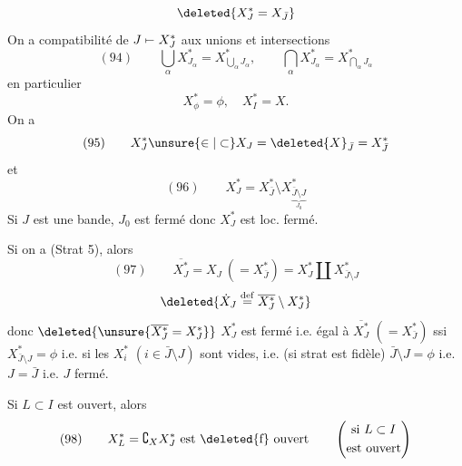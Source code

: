
\[
\deleted{X_J^*=X_{\bar J}}
\]
On a compatibilité de $J\mathrel{\mapstochar\relbar}X_J^*$ aux unions et intersections
\[
(94)\qquad\bigcup_\alpha X_{J_\alpha}^*=X_{\bigcup_\alpha J_\alpha}^*,\qquad\bigcap_\alpha X_{J_\alpha}^*=X_{\bigcap_\alpha J_\alpha}^*
\]
en particulier
\[
X_\phi^*=\phi,\quad X_I^*=X.
\]
On a
\[
(95)\qquad X_J^*\unsure{\in|\subset}X_J=\deleted{X}_{\bar J}=X_{\bar J}^*
\]
et
\[
(96)\qquad X_J^*=X_{\bar J}^*\setminus X_{\underbrace{\bar J\setminus J}_{J_0}}^*
\]
Si $J$ est une bande, $J_0$ est fermé donc $X_J^*$ est loc. fermé.

Si on a (Strat 5), alors
\[
(97)\qquad\overline{X_J^*}=X_J\ (=X_{\bar J}^*)=X_J^*\amalg X_{\bar J\setminus J}^*
\]
\[
\deleted{\dot X_J\overset{\mathrm{def}}=\overline{X_J^*}\setminus X_J^*}
\]
donc $\deleted{\unsure{\overline{X_J^*}=X_J^*}}$ $X_J^*$ est fermé i.e. égal à $\overline{X_J^*}$ $(=X_{\bar J}^*)$ ssi $X_{\bar J\setminus J}^*=\phi$ i.e. si les $X_i^*$ $(i\in\bar J\setminus J)$ sont vides, i.e. (si strat est fidèle)  $\bar J\setminus J=\phi$ i.e. $J=\bar J$ i.e. $J$ fermé.

Si  $L\subset I$ est ouvert,  alors
\[
(98)\qquad X_L^*=\complement_X X_J^*\text{ est }\text{\deleted{f}}\text{ ouvert}\qquad\left(\begin{gathered}\text{si }L\subset I\\\text{est ouvert}\end{gathered}\right)
\]
